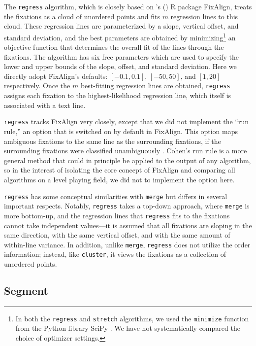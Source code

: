\documentclass[doc,biblatex]{apa7}
\newcommand\possessivecite[1]{\citeauthor{#1}'s (\citeyear{#1})} %
\begin{document}
The \texttt{regress} algorithm, which is closely based on \possessivecite{Cohen:2013} R package FixAlign, treats the fixations as a cloud of unordered points and fits $m$ regression lines to this cloud. These regression lines are parameterized by a slope, vertical offset, and standard deviation, and the best parameters are obtained by minimizing\footnote{In both the \texttt{regress} and \texttt{stretch} algorithms, we used the \texttt{minimize} function from the Python library SciPy \parencite{Virtanen:2020}. We have not systematically compared the choice of optimizer settings.} an objective function that determines the overall fit of the lines through the fixations. The algorithm has six free parameters which are used to specify the lower and upper bounds of the slope, offset, and standard deviation. Here we directly adopt FixAlign's defaults: $[-0.1, 0.1]$, $[-50, 50]$, and $[1, 20]$ respectively. Once the $m$ best-fitting regression lines are obtained, \texttt{regress} assigns each fixation to the highest-likelihood regression line, which itself is associated with a text line.

\texttt{regress} tracks FixAlign very closely, except that we did not implement the ``run rule,'' an option that is switched on by default in FixAlign. This option maps ambiguous fixations to the same line as the surrounding fixations, if the surrounding fixations were classified unambiguously \parencite[p.~680]{Cohen:2013}. Cohen's run rule is a more general method that could in principle be applied to the output of any algorithm, so in the interest of isolating the core concept of FixAlign and comparing all algorithms on a level playing field, we did not to implement the option here.

\texttt{regress} has some conceptual similarities with \texttt{merge} but differs in several important respects. Notably, \texttt{regress} takes a top-down approach, where \texttt{merge} is more bottom-up, and the regression lines that \texttt{regress} fits to the fixations cannot take independent values---it is assumed that all fixations are sloping in the same direction, with the same vertical offset, and with the same amount of within-line variance. In addition, unlike \texttt{merge}, \texttt{regress} does not utilize the order information; instead, like \texttt{cluster}, it views the fixations as a collection of unordered points.

\subsection{Segment}
\end{document}
